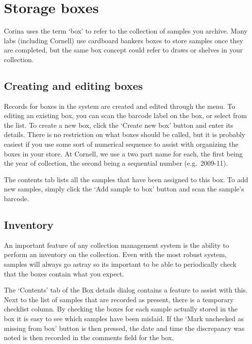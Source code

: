 \section{Storage boxes}
\label{txt:assignToBox}
Corina uses the term `box' to refer to the collection of samples you archive.  Many labs (including Cornell) use cardboard bankers boxes to store samples once they are completed, but the same box concept could refer to draws or shelves in your collection.

\subsection{Creating and editing boxes}
Records for boxes in the system are created and edited through the  menu.  To editing an existing box, you can scan the barcode label on the box, or select from the list.  To create a new box, click the `Create new box' button and enter its details.  There is no restriction on what boxes should be called, but it is probably easiest if you use some sort of numerical sequence to assist with organizing the boxes in your store.  At Cornell, we use a two part name for each, the first being the year of collection, the second being a sequential number (e.g.\ 2009-11).

The contents tab lists all the samples that have been assigned to this box.  To add new samples, simply click the `Add sample to box' button and scan the sample's barcode.  

\subsection{Inventory}
An important feature of any collection management system is the ability to perform an inventory on the collection.  Even with the most robust system, samples will always go astray so its important to be able to periodically check that the boxes contain what you expect.

The `Contents' tab of the Box details dialog contains a feature to assist with this.  Next to the list of samples that are recorded as present, there is a temporary checklist column.  By checking the boxes for each sample actually stored in the box it is easy to see which samples have been mislaid.  If the `Mark unchecked as missing from box' button is then pressed, the date and time the discrepancy was noted is then recorded in the comments field for the box.

